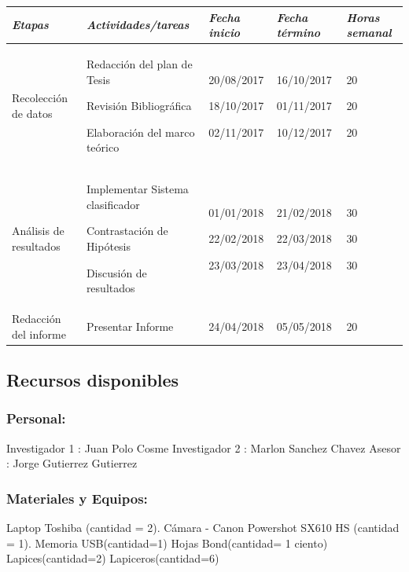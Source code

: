 \documentclass[a4paper, 12pt]{article}
\begin{document}
 \begin{table}[h!]
\centering
\begin{tabular}{|p{3.9cm} |p{5.6cm} |p{2.1cm} |p{2.1cm} |p{1.5cm}|} \hline
\textit{{\bf{Etapas}}} & \textit{{\bf{Actividades/tareas}}} & \textit{{\bf{Fecha inicio}}} & \textit{{\bf{Fecha término}}} & \textit{{\bf{Horas semanal}}}\\ \hline
Recolección de datos & Redacción del plan de Tesis \par Revisión Bibliográfica\par Elaboración del marco teórico  & \par 20/08/2017\par \par 18/10/2017\par 02/11/2017     & 16/10/2017\par 01/11/2017\par 10/12/2017       & 20\par 20\par 20                 \\  \hline
Análisis de resultados & Implementar Sistema clasificador \par Contrastación de Hipótesis\par Discusión de resultados  &   01/01/2018\par 22/02/2018\par 23/03/2018   &  21/02/2018\par 22/03/2018\par 23/04/2018    &              
30\par 30\par 30  \\  \hline
Redacción del informe  & Presentar Informe  &  24/04/2018    &  05/05/2018    &        20          \\  \hline
\end{tabular}
\end{table}

\newpage


\subsection{Recursos disponibles}
\subsubsection{{\bf Personal:}} 
Investigador 1 : Juan Polo Cosme \vskip 0.1cm
Investigador 2 : Marlon Sanchez Chavez \vskip 0.1cm
Asesor : Jorge Gutierrez Gutierrez
\subsubsection{ {\bf	Materiales y Equipos:}} 
Laptop Toshiba (cantidad = 2).\vskip 0.1cm
Cámara - Canon Powershot SX610 HS (cantidad = 1).\vskip 0.1cm
Memoria USB(cantidad=1)\vskip 0.1cm
Hojas Bond(cantidad= 1 ciento)\vskip 0.1cm
Lapices(cantidad=2)\vskip 0.1cm
Lapiceros(cantidad=6)\vskip 0.1cm
\end{document}
